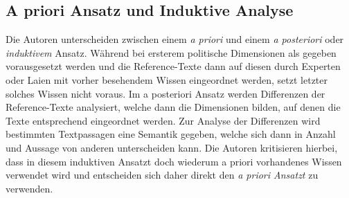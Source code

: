   
  \subsection{A priori Ansatz und Induktive Analyse}
Die Autoren unterscheiden zwischen einem \emph{a priori} und einem \emph{a posteriori} oder \emph{induktivem} Ansatz. Während bei ersterem politische Dimensionen als gegeben vorausgesetzt werden und die Reference-Texte dann auf diesen durch Experten oder Laien mit vorher besehendem Wissen eingeordnet werden, setzt letzter solches Wissen nicht voraus. Im a posteriori Ansatz werden Differenzen der Reference-Texte analysiert, welche dann die Dimensionen bilden, auf denen die Texte entsprechend eingeordnet werden. Zur Analyse der Differenzen wird bestimmten Textpassagen eine Semantik gegeben, welche sich dann in Anzahl und Aussage von anderen unterscheiden kann. Die Autoren kritisieren hierbei, dass in diesem induktiven Ansatzt doch wiederum a priori vorhandenes Wissen verwendet wird und entscheiden sich daher direkt den \emph{a priori Ansatzt} zu verwenden.
  
  
